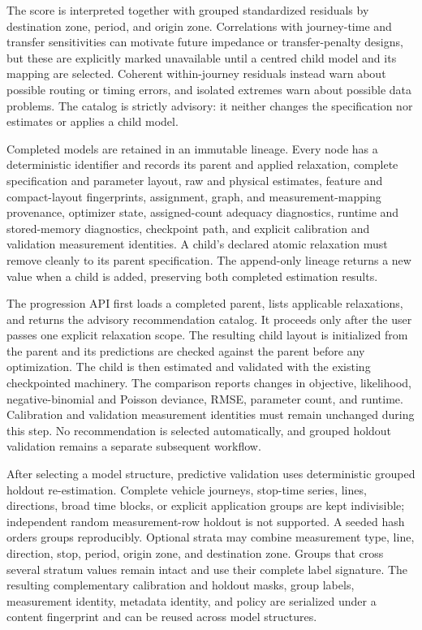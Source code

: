 The score is interpreted together with grouped standardized residuals by
destination zone, period, and origin zone.  Correlations with journey-time and
transfer sensitivities can motivate future impedance or transfer-penalty designs,
but these are explicitly marked unavailable until a centred child model and its
mapping are selected.  Coherent within-journey residuals instead warn about
possible routing or timing errors, and isolated extremes warn about possible data
problems.  The catalog is strictly advisory: it neither changes the specification
nor estimates or applies a child model.

Completed models are retained in an immutable lineage.  Every node has a
deterministic identifier and records its parent and applied relaxation, complete
specification and parameter layout, raw and physical estimates, feature and
compact-layout fingerprints, assignment, graph, and measurement-mapping
provenance, optimizer state, assigned-count adequacy diagnostics, runtime and
stored-memory diagnostics, checkpoint path, and explicit calibration and
validation measurement identities.  A child's declared atomic relaxation must
remove cleanly to its parent specification.  The append-only lineage returns a
new value when a child is added, preserving both completed estimation results.

The progression API first loads a completed parent, lists applicable relaxations,
and returns the advisory recommendation catalog.  It proceeds only after the user
passes one explicit relaxation scope.  The resulting child layout is initialized
from the parent and its predictions are checked against the parent before any
optimization.  The child is then estimated and validated with the existing
checkpointed machinery.  The comparison reports changes in objective, likelihood,
negative-binomial and Poisson deviance, RMSE, parameter count, and runtime.
Calibration and validation measurement identities must remain unchanged during
this step.  No recommendation is selected automatically, and grouped holdout
validation remains a separate subsequent workflow.

After selecting a model structure, predictive validation uses deterministic
grouped holdout re-estimation.  Complete vehicle journeys, stop-time series,
lines, directions, broad time blocks, or explicit application groups are kept
indivisible; independent random measurement-row holdout is not supported.  A
seeded hash orders groups reproducibly.  Optional strata may combine measurement
type, line, direction, stop, period, origin zone, and destination zone.  Groups
that cross several stratum values remain intact and use their complete label
signature.  The resulting complementary calibration and holdout masks, group
labels, measurement identity, metadata identity, and policy are serialized under
a content fingerprint and can be reused across model structures.

